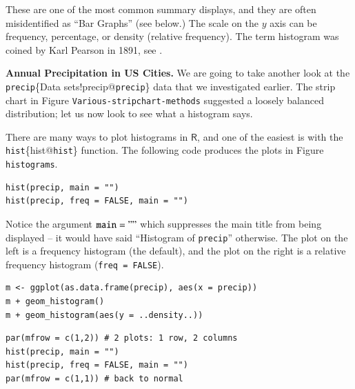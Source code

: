 \documentclass[10pt,english]{scrbook}
\begin{document}
These are one of the most common summary displays, and they are often misidentified as ``Bar Graphs'' (see below.) The scale on the \(y\) axis can be frequency, percentage, or density (relative frequency). The term histogram was coined by Karl Pearson in 1891, see \cite{Miller}.

\begin{exampletoo}

\textbf{Annual Precipitation in US Cities.} We are going to take another look at the \texttt{precip}\index\{Data sets!precip@\texttt{precip}\} data that we investigated earlier. The strip chart in Figure \texttt{Various-stripchart-methods} suggested a loosely balanced distribution; let us now look to see what a histogram says. 

There are many ways to plot histograms in \(\mathsf{R}\), and one of the easiest is with the \texttt{hist}\index\{hist@\texttt{hist}\} function. The following code produces the plots in Figure \texttt{histograms}.

\begin{verbatim}
hist(precip, main = "")
hist(precip, freq = FALSE, main = "")
\end{verbatim}

Notice the argument \(\mathtt{main = ""}\) which suppresses the main title from being displayed -- it would have said ``Histogram of \texttt{precip}'' otherwise. The plot on the left is a frequency histogram (the default), and the plot on the right is a relative frequency histogram (\texttt{freq = FALSE}). 

\begin{verbatim}
m <- ggplot(as.data.frame(precip), aes(x = precip))
m + geom_histogram()
m + geom_histogram(aes(y = ..density..))
\end{verbatim}

\begin{verbatim}
par(mfrow = c(1,2)) # 2 plots: 1 row, 2 columns
hist(precip, main = "")
hist(precip, freq = FALSE, main = "")
par(mfrow = c(1,1)) # back to normal
\end{verbatim}


\end{exampletoo}
\end{document}
